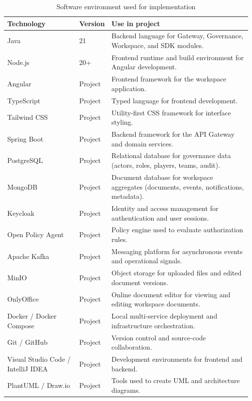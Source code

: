 \begin{table}[!htbp]
\centering
\caption{Software environment used for implementation}
\label{tab:software-environment}
\normalsize
\renewcommand{\arraystretch}{1.18}
\setlength{\tabcolsep}{5pt}
\begin{tabularx}{\textwidth}{|L{3.4cm}|C{2.1cm}|Y|}
\hline
\textbf{Technology} & \textbf{Version} & \textbf{Use in project} \\
\hline
Java & 21 & Backend language for Gateway, Governance, Workspace, and SDK modules. \\
\hline
Node.js & 20+ & Frontend runtime and build environment for Angular development. \\
\hline
Angular & Project & Frontend framework for the workspace application. \\
\hline
TypeScript & Project & Typed language for frontend development. \\
\hline
Tailwind CSS & Project & Utility-first CSS framework for interface styling. \\
\hline
Spring Boot & Project & Backend framework for the API Gateway and domain services. \\
\hline
PostgreSQL & Project & Relational database for governance data (actors, roles, players, teams, audit). \\
\hline
MongoDB & Project & Document database for workspace aggregates (documents, events, notifications, metadata). \\
\hline
Keycloak & Project & Identity and access management for authentication and user sessions. \\
\hline
Open Policy Agent & Project & Policy engine used to evaluate authorization rules. \\
\hline
Apache Kafka & Project & Messaging platform for asynchronous events and operational signals. \\
\hline
MinIO & Project & Object storage for uploaded files and edited document versions. \\
\hline
OnlyOffice & Project & Online document editor for viewing and editing workspace documents. \\
\hline
Docker / Docker Compose & Project & Local multi-service deployment and infrastructure orchestration. \\
\hline
Git / GitHub & Project & Version control and source-code collaboration. \\
\hline
Visual Studio Code / IntelliJ IDEA & Project & Development environments for frontend and backend. \\
\hline
PlantUML / Draw.io & Project & Tools used to create UML and architecture diagrams. \\
\hline
\end{tabularx}
\normalsize
\end{table}

